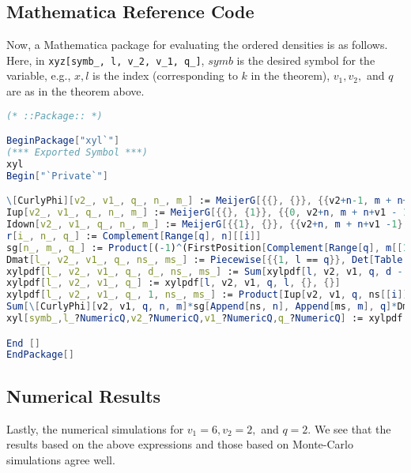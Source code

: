 \subsection{Mathematica Reference Code}

Now, a Mathematica package for evaluating the ordered densities is as follows. Here, in \verb!xyz[symb_, l, v_2, v_1, q_]!, $symb$ is the desired symbol for the variable, e.g., $x, l$ is the index (corresponding to $k$ in the theorem), $v_1, v_2,$ and $q$ are as in the theorem above.

\begin{lstlisting}[language=Mathematica,numbers=none]
(* ::Package:: *)

BeginPackage["xyl`"]
(*** Exported Symbol ***)
xyl
Begin["`Private`"]

\[CurlyPhi][v2_, v1_, q_, n_, m_] := MeijerG[{{}, {}}, {{v2+n-1, m + n+v1 - 2}, {}}, s]; 
Iup[v2_, v1_, q_, n_, m_] := MeijerG[{{}, {1}}, {{0, v2+n, m + n+v1 - 1}, {}}, s]; 
Idown[v2_, v1_, q_, n_, m_] := MeijerG[{{1}, {}}, {{v2+n, m + n+v1 -1}, {0}}, s]; 
r[i_, n_, q_] := Complement[Range[q], n][[i]]
sg[n_, m_, q_] := Product[(-1)^(FirstPosition[Complement[Range[q], m[[1 ;; i - 1]]], m[[i]]] + FirstPosition[Complement[Range[q], n[[1 ;; i - 1]]], n[[i]]]), {i, 1, Length[n]}]
Dmat[l_, v2_, v1_, q_, ns_, ms_] := Piecewise[{{1, l == q}}, Det[Table[Idown[v2, v1, q, r[n, ns, q], r[m, ms, q]], {n, 1, q - l}, {m, 1, q - l}]]]
xylpdf[l_, v2_, v1_, q_, d_, ns_, ms_] := Sum[xylpdf[l, v2, v1, q, d - 1, Append[ns, n], Append[ms, m]], {n, Complement[Range[q], ns]}, {m, Complement[Range[q], ms]}]
xylpdf[l_, v2_, v1_, q_] := xylpdf[l, v2, v1, q, l, {}, {}]
xylpdf[l_, v2_, v1_, q_, 1, ns_, ms_] := Product[Iup[v2, v1, q, ns[[i]], ms[[i]]], {i, 1, l - 1}]*
Sum[\[CurlyPhi][v2, v1, q, n, m]*sg[Append[ns, n], Append[ms, m], q]*Dmat[l, v2, v1, q, Append[ns, n], Append[ms, m]], {n, Complement[Range[q], ns]}, {m, Complement[Range[q], ms]}]
xyl[symb_,l_?NumericQ,v2_?NumericQ,v1_?NumericQ,q_?NumericQ] := xylpdf[l, v2, v1, q]/(Product[Gamma[n] Gamma[n+v1] Gamma[n+v2],{n,1,q}] Factorial[l-1]) /. s->symb ;

End []
EndPackage[]
\end{lstlisting}

\subsection{Numerical Results}

Lastly, the numerical simulations for $v_1 = 6, v_2 = 2,$ and $q = 2.$ We see that the results based on the above expressions and those based on Monte-Carlo simulations agree well.

